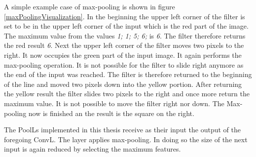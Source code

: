 A simple example case of max-pooling is shown in figure \ref{maxPoolingVisualization}. In the beginning the upper left corner of the filter is set to be in the upper left corner of the input which is the red part of the image. The maximum value from the values \textit{1; 1; 5; 6;} is \textit{6}. The filter therefore returns the red result \textit{6}. Next the upper left corner of the filter moves two pixels to the right. It now occupies the green part of the input image. It again performs the max-pooling operation. It is not possible for the filter to slide right anymore as the end of the input was reached. The filter is therefore returned to the beginning of the line and moved two pixels down into the yellow portion. After returning the yellow result the filter slides two pixels to the right and once more return the maximum value. It is not possible to move the filter right nor down. The Max-pooling now is finished an the result is the square on the right.

The PoolLs implemented in this thesis receive as their input the output of the foregoing ConvL. The layer applies max-pooling. In doing so the size of the next input is again reduced by selecting the maximum features.

